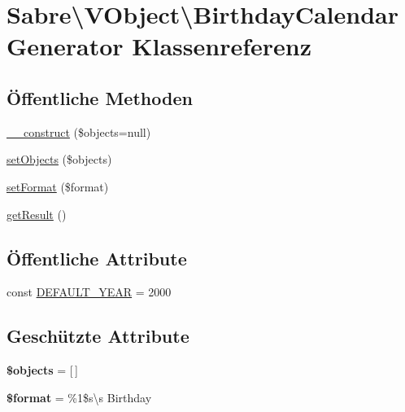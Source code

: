 \hypertarget{class_sabre_1_1_v_object_1_1_birthday_calendar_generator}{}\section{Sabre\textbackslash{}V\+Object\textbackslash{}Birthday\+Calendar\+Generator Klassenreferenz}
\label{class_sabre_1_1_v_object_1_1_birthday_calendar_generator}
\subsection*{Öffentliche Methoden}
\begin{DoxyCompactItemize}
\item 
\mbox{\hyperlink{class_sabre_1_1_v_object_1_1_birthday_calendar_generator_a0f5c3bec25e4ef73ae29fd7042a916e1}{\+\_\+\+\_\+construct}} (\$objects=null)
\item 
\mbox{\hyperlink{class_sabre_1_1_v_object_1_1_birthday_calendar_generator_a5e45f6fe7363a9d1842020ddf81e3d85}{set\+Objects}} (\$objects)
\item 
\mbox{\hyperlink{class_sabre_1_1_v_object_1_1_birthday_calendar_generator_a7cb5e8d84190f82715646dc5d50dc86b}{set\+Format}} (\$format)
\item 
\mbox{\hyperlink{class_sabre_1_1_v_object_1_1_birthday_calendar_generator_a3819d986ac49e0ce6df240d9fd95d606}{get\+Result}} ()
\end{DoxyCompactItemize}
\subsection*{Öffentliche Attribute}
\begin{DoxyCompactItemize}
\item 
const \mbox{\hyperlink{class_sabre_1_1_v_object_1_1_birthday_calendar_generator_ada02ff1d497785eb71d0c14b71fb0275}{D\+E\+F\+A\+U\+L\+T\+\_\+\+Y\+E\+AR}} = 2000
\end{DoxyCompactItemize}
\subsection*{Geschützte Attribute}
\begin{DoxyCompactItemize}
\item 
\mbox{\label{class_sabre_1_1_v_object_1_1_birthday_calendar_generator_a2d5faac7cd6e22de944831f02ca9f869}} 
{\bfseries \$objects} = \mbox{[}$\,$\mbox{]}
\item 
\mbox{\label{class_sabre_1_1_v_object_1_1_birthday_calendar_generator_a4416d19aab8a9f64e51ba08947a9476e}} 
{\bfseries \$format} = \textquotesingle{}\%1\$s\textbackslash{}\textquotesingle{}s Birthday\textquotesingle{}
\end{DoxyCompactItemize}


